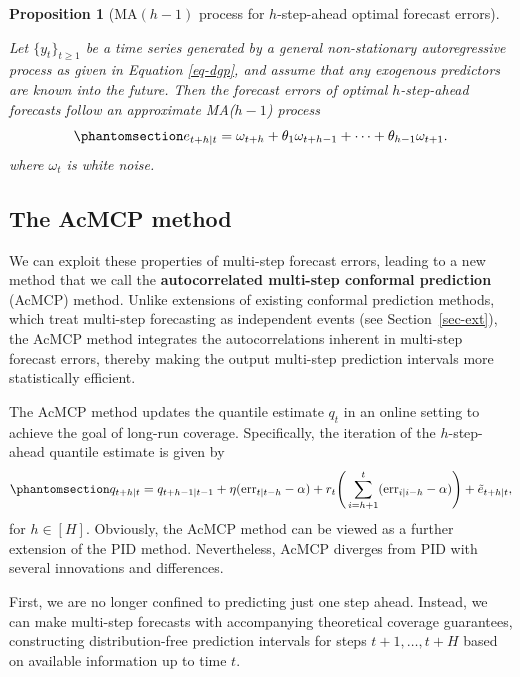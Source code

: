\documentclass[
  11pt,
  12pt]{article}
\theoremstyle{plain}
\newtheorem{proposition}{Proposition}[section]
\theoremstyle{remark}
\begin{document}
\begin{proposition}[MA\((h-1)\) process for \(h\)-step-ahead optimal
forecast errors]\protect\hypertarget{prp-ma}{}\label{prp-ma}

Let \(\{y_t\}_{t \geq 1}\) be a time series generated by a general
non-stationary autoregressive process as given in Equation
\eqref{eq-dgp}, and assume that any exogenous predictors are known into
the future. Then the forecast errors of optimal \(h\)-step-ahead
forecasts follow an approximate MA(\(h-1\)) process
\begin{equation}\phantomsection\label{eq-ma}{
e_{t+h|t} = \omega_{t+h} + \theta_1\omega_{t+h-1} + \cdots + \theta_{h-1}\omega_{t+1}.
}\end{equation} where \(\omega_{t}\) is white noise.

\end{proposition}

\subsection{The AcMCP method}\label{sec-novel}

We can exploit these properties of multi-step forecast errors, leading
to a new method that we call the \textbf{autocorrelated multi-step
conformal prediction} (AcMCP) method. Unlike extensions of existing
conformal prediction methods, which treat multi-step forecasting as
independent events (see Section~\ref{sec-ext}), the AcMCP method
integrates the autocorrelations inherent in multi-step forecast errors,
thereby making the output multi-step prediction intervals more
statistically efficient.

The AcMCP method updates the quantile estimate \(q_t\) in an online
setting to achieve the goal of long-run coverage. Specifically, the
iteration of the \(h\)-step-ahead quantile estimate is given by
\begin{equation}\phantomsection\label{eq-acmcp}{
q_{t+h|t}=q_{t+h-1|t-1}+\eta (\mathrm{err}_{t|t-h}-\alpha)+r_t\Bigg(\sum_{i=h+1}^t (\mathrm{err}_{i|i-h}-\alpha)\Bigg)+\tilde{e}_{t+h|t},
}\end{equation} for \(h\in[H]\). Obviously, the AcMCP method can be
viewed as a further extension of the PID method. Nevertheless, AcMCP
diverges from PID with several innovations and differences.

First, we are no longer confined to predicting just one step ahead.
Instead, we can make multi-step forecasts with accompanying theoretical
coverage guarantees, constructing distribution-free prediction intervals
for steps \(t+1,\ldots,t+H\) based on available information up to time
\(t\).
\end{document}

